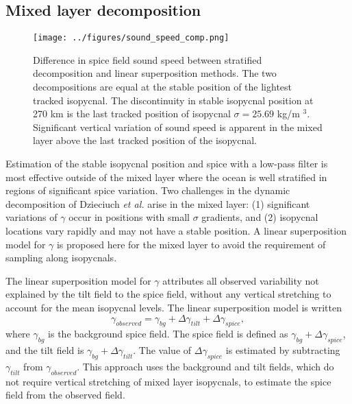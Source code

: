 \documentclass[preprint,NumberedRefs]{JASA}
\begin{document}

\subsection{Mixed layer decomposition}
\begin{figure}
\texttt{[image: ../figures/sound\_speed\_comp.png]}
    \caption{\label{fig:c_diff}{Difference in spice field sound speed between stratified decomposition and linear superposition methods. The two decompositions are equal at the stable position of the lightest tracked isopycnal. The discontinuity in stable isopycnal position at 270 km is the last tracked position of isopycnal $\sigma=25.69$ kg/m $^3$. Significant vertical variation of sound speed is apparent in the mixed layer above the last tracked position of the isopycnal.}}
\end{figure}

Estimation of the stable isopycnal position and spice with a low-pass filter is most effective outside of the mixed layer where the ocean is well stratified in regions of significant spice variation. Two challenges in the dynamic decomposition of Dzieciuch \emph{et al.}\citep{dzieciuch2004} arise in the mixed layer: (1) significant variations of $\gamma$ occur in positions with small $\sigma$ gradients, and (2) isopycnal locations vary rapidly and may not have a stable position. A linear superposition model for $\gamma$ is proposed here for the mixed layer to avoid the requirement of sampling along isopycnals.

The linear superposition model for $\gamma$ attributes all observed variability not explained by the tilt field to the spice field, without any vertical stretching to account for the mean isopycnal levels. The linear superposition model is written
\begin{equation}
    \gamma_{observed} = \gamma_{bg} + \Delta \gamma_{tilt} + \Delta \gamma_{spice},
    \label{eq:lin_sup}
\end{equation}
where $\gamma_{bg}$ is the background spice field. The spice field is defined as $\gamma_{bg} + \Delta \gamma_{spice}$, and the tilt field is $\gamma_{bg} + \Delta \gamma_{tilt}$. The value of $\Delta \gamma_{spice}$ is estimated by subtracting $\gamma_{tilt}$ from $\gamma_{observed}$. This approach uses the background and tilt fields, which do not require vertical stretching of mixed layer isopycnals, to estimate the spice field from the observed field.
\end{document}
